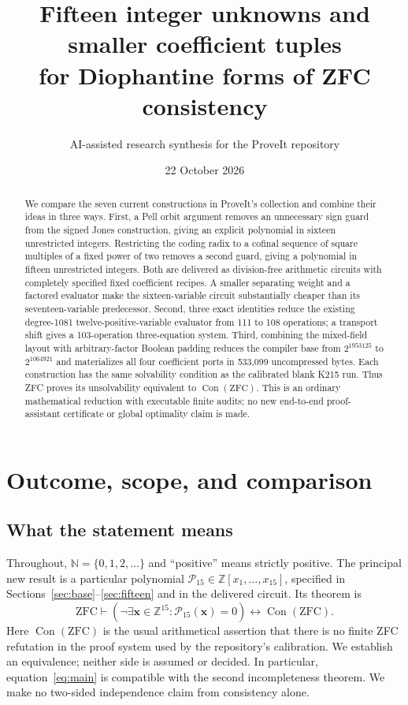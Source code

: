 \documentclass[11pt]{article}
\title{Fifteen integer unknowns and smaller coefficient tuples\\for Diophantine forms of ZFC consistency}
\author{AI-assisted research synthesis for the ProveIt repository}
\date{22 October 2026}
\theoremstyle{definition}\newtheorem{definition}[theorem]{Definition}
\newcommand{\Z}{\mathbb Z}\newcommand{\N}{\mathbb N}\newcommand{\Q}{\mathbb Q}
\newcommand{\Con}{\operatorname{Con}(\mathrm{ZFC})}
\begin{document}
\maketitle
\begin{abstract}
We compare the seven current constructions in ProveIt's collection and combine their ideas in three ways. First, a Pell orbit argument removes an unnecessary sign guard from the signed Jones construction, giving an explicit polynomial in sixteen unrestricted integers. Restricting the coding radix to a cofinal sequence of square multiples of a fixed power of two removes a second guard, giving a polynomial in fifteen unrestricted integers. Both are delivered as division-free arithmetic circuits with completely specified fixed coefficient recipes. A smaller separating weight and a factored evaluator make the sixteen-variable circuit substantially cheaper than its seventeen-variable predecessor. Second, three exact identities reduce the existing degree-1081 twelve-positive-variable evaluator from 111 to 108 operations; a transport shift gives a 103-operation three-equation system. Third, combining the mixed-field layout with arbitrary-factor Boolean padding reduces the compiler base from $2^{1953125}$ to $2^{1064921}$ and materializes all four coefficient ports in 533,099 uncompressed bytes. Each construction has the same solvability condition as the calibrated blank K215 run. Thus ZFC proves its unsolvability equivalent to $\Con$. This is an ordinary mathematical reduction with executable finite audits; no new end-to-end proof-assistant certificate or global optimality claim is made.
\end{abstract}
\setcounter{tocdepth}{1}
\tableofcontents
\newpage

\section{Outcome, scope, and comparison}
\subsection{What the statement means}
Throughout, $\N=\{0,1,2,\ldots\}$ and ``positive'' means strictly positive. The principal new result is a particular polynomial $\mathcal P_{15}\in\Z[x_1,\ldots,x_{15}]$, specified in Sections~\ref{sec:base}--\ref{sec:fifteen} and in the delivered circuit. Its theorem is
\begin{equation}\label{eq:main}
 \mathrm{ZFC}\vdash
 \left(\neg\exists\mathbf x\in\Z^{15}:\mathcal P_{15}(\mathbf x)=0\right)
 \longleftrightarrow\Con.
\end{equation}
Here $\Con$ is the usual arithmetical assertion that there is no finite ZFC refutation in the proof system used by the repository's calibration. We establish an equivalence; neither side is assumed or decided. In particular, equation~\eqref{eq:main} is compatible with the second incompleteness theorem. We make no two-sided independence claim from consistency alone.
\end{document}
